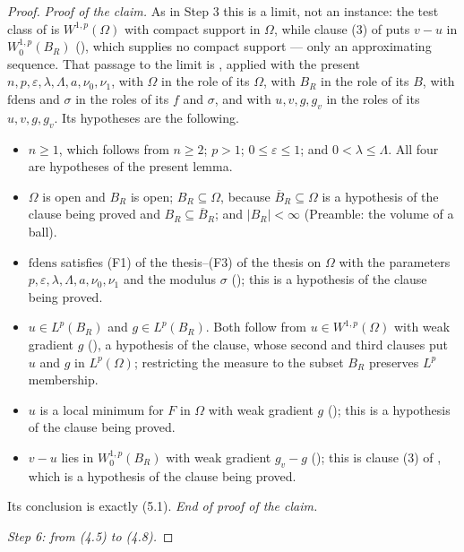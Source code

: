 \begin{proof}
\emph{Proof of the claim.}  As in Step 3 this is a limit, not an instance: the
test class of  is $W^{1,p}(\Omega)$ with compact
support in $\Omega$, while clause (3) of  puts
$v-u$ in $W^{1,p}_0(B_R)$ (), which supplies no compact
support --- only an approximating sequence.  That passage to the limit is
, applied with the present
$n,p,\varepsilon,\lambda,\Lambda,a,\nu_0,\nu_1$, with $\Omega$ in the role of
its $\Omega$, with $B_R$ in the role of its $B$, with $\mathrm{fdens}$ and
$\sigma$ in the roles of its $f$ and $\sigma$, and with $u,v,g,g_v$ in the
roles of its $u,v,g,g_v$.  Its hypotheses are the following.
\begin{itemize}
\item $n\ge1$, which follows from $n\ge2$; $p>1$; $0\le\varepsilon\le1$; and
  $0<\lambda\le\Lambda$.  All four are hypotheses of the present lemma.
\item $\Omega$ is open and $B_R$ is open; $B_R\subseteq\Omega$, because
  $\overline B_R\subseteq\Omega$ is a hypothesis of the clause being proved and
  $B_R\subseteq\overline B_R$; and $|B_R|<\infty$ (Preamble: the volume of a
  ball).
\item $\mathrm{fdens}$ satisfies (F1) of the thesis--(F3) of the thesis on $\Omega$ with
  the parameters $p,\varepsilon,\lambda,\Lambda,a,\nu_0,\nu_1$ and the modulus
  $\sigma$ (); this is a hypothesis of the
  clause being proved.
\item $u\in L^p(B_R)$ and $g\in L^p(B_R)$.  Both follow from
  $u\in W^{1,p}(\Omega)$ with weak gradient $g$ (), a
  hypothesis of the clause, whose second and third clauses put $u$ and $g$ in
  $L^p(\Omega)$; restricting the measure to the subset $B_R$ preserves $L^p$
  membership.
\item $u$ is a local minimum for $F$ in $\Omega$ with weak gradient $g$
  (); this is a hypothesis of the clause being
  proved.
\item $v-u$ lies in $W^{1,p}_0(B_R)$ with weak gradient $g_v-g$
  (); this is clause (3) of
  , which is a hypothesis of the clause being
  proved.
\end{itemize}
Its conclusion is exactly (5.1).  \emph{End of proof of the claim.}

\medskip
\noindent\emph{Step 6: from \textup{(4.5)} to \textup{(4.8)}.}


\end{proof}
